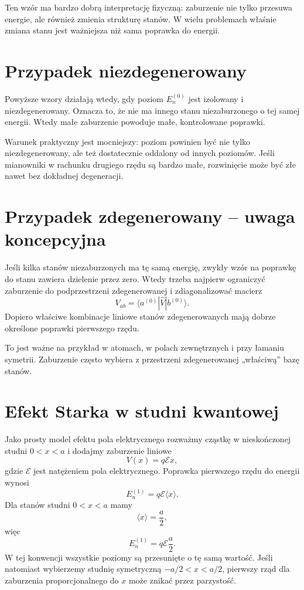Ten wzór ma bardzo dobrą interpretację fizyczną: zaburzenie nie tylko przesuwa energie, ale również zmienia strukturę stanów. W wielu problemach właśnie zmiana stanu jest ważniejsza niż sama poprawka do energii.

\section{Przypadek niezdegenerowany}

Powyższe wzory działają wtedy, gdy poziom \(E_n^{(0)}\) jest izolowany i niezdegenerowany. Oznacza to, że nie ma innego stanu niezaburzonego o tej samej energii. Wtedy małe zaburzenie powoduje małe, kontrolowane poprawki.

Warunek praktyczny jest mocniejszy: poziom powinien być nie tylko niezdegenerowany, ale też dostatecznie oddalony od innych poziomów. Jeśli mianowniki w rachunku drugiego rzędu są bardzo małe, rozwinięcie może być złe nawet bez dokładnej degeneracji.

\section{Przypadek zdegenerowany -- uwaga koncepcyjna}

Jeśli kilka stanów niezaburzonych ma tę samą energię, zwykły wzór na poprawkę do stanu zawiera dzielenie przez zero. Wtedy trzeba najpierw ograniczyć zaburzenie do podprzestrzeni zdegenerowanej i zdiagonalizować macierz
\begin{equation}
    V_{ab}=\langle a^{(0)}|\hat{V}|b^{(0)}\rangle.
\end{equation}
Dopiero właściwe kombinacje liniowe stanów zdegenerowanych mają dobrze określone poprawki pierwszego rzędu.

To jest ważne na przykład w atomach, w polach zewnętrznych i przy łamaniu symetrii. Zaburzenie często wybiera z przestrzeni zdegenerowanej „właściwą” bazę stanów.

\section{Efekt Starka w studni kwantowej}

Jako prosty model efektu pola elektrycznego rozważmy cząstkę w nieskończonej studni \(0<x<a\) i dodajmy zaburzenie liniowe
\begin{equation}
    V(x)=q\mathcal{E}x,
\end{equation}
gdzie \(\mathcal{E}\) jest natężeniem pola elektrycznego. Poprawka pierwszego rzędu do energii wynosi
\begin{equation}
    E_n^{(1)}=q\mathcal{E}\langle x\rangle.
\end{equation}
Dla stanów studni \(0<x<a\) mamy
\begin{equation}
    \langle x\rangle=\frac{a}{2},
\end{equation}
więc
\begin{equation}
    E_n^{(1)}=q\mathcal{E}\frac{a}{2}.
\end{equation}
W tej konwencji wszystkie poziomy są przesunięte o tę samą wartość. Jeśli natomiast wybierzemy studnię symetryczną \(-a/2<x<a/2\), pierwszy rząd dla zaburzenia proporcjonalnego do \(x\) może znikać przez parzystość.

